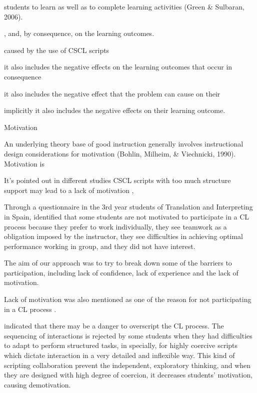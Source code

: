 students to learn as well as to complete learning activities (Green & Sulbaran, 2006). 




, and, by consequence, on the learning outcomes.


caused by the use of CSCL scripts

 

it also includes the negative effects on the learning outcomes that occur in consequence  

it also includes the negative effect that the  problem can cause on their 

 implicitly it also includes the negative effects on their learning outcome.


Motivation 


An underlying theory base of good instruction generally involves instructional design considerations for motivation (Bohlin, Milheim, & Viechnicki, 1990). Motivation is 




It's pointed out in different studies 
CSCL scripts with too much structure support may lead to a lack of motivation , 


Through a questionnaire in the 3rd year students of Translation and Interpreting in Spain,  identified that some students are not motivated to participate in a CL process because they prefer to work individually, they see teamwork as a obligation imposed by the instructor, they see difficulties in achieving optimal performance working in group, and they did not have interest.

The aim of our approach was to try to break down some of the barriers to participation, including lack of confidence, lack of experience and the lack of motivation.

Lack of motivation was also mentioned as one of the reason for not participating in a CL process \cite{LofstromNevgi2007}.



 indicated that there may be a danger to overscript the CL process. The sequencing of interactions is rejected by some students when they had difficulties to adapt to perform structured tasks, in specially, for highly coercive scripts which dictate interaction in a very detailed and inflexible way. This kind of scripting collaboration prevent the independent, exploratory thinking, and when they are designed with high degree of coercion, it decreases students' motivation, causing demotivation.





